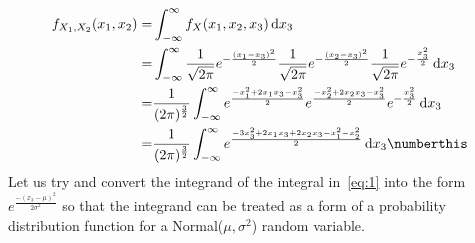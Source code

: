 \documentclass{mthe353answer}
\begin{document}
\begin{questions}
  \setcounter{question}{1}
  \question{}
  \begin{align*}
    f_{X_1,X_2}(x_1,x_2) =& \int_{-\infty}^{\infty} f_X(x_1,x_2,x_3) \,\mathrm{d}x_3\\
    =& \int_{-\infty}^{\infty} \frac{1}{\sqrt{2\pi}} e^{-\frac{(x_1-x_3)^2}{2}} \frac{1}{\sqrt{2\pi}} e^{-\frac{(x_2-x_3)^2}{2}} \frac{1}{\sqrt{2\pi}} e^{-\frac{x_3^2}{2}} \,\mathrm{d}x_3\\
    =& \frac{1}{(2\pi)^\frac{3}{2}} \int_{-\infty}^{\infty} e^{\frac{-x_1^2+2x_1x_3-x_3^2}{2}} e^{\frac{-x_2^2+2x_2x_3-x_3^2}{2}} e^{-\frac{x_3^2}{2}} \,\mathrm{d}x_3\\
    =& \frac{1}{(2\pi)^\frac{3}{2}} \int_{-\infty}^{\infty} e^{\frac{-3x_3^2+2x_1x_3+2x_2x_3-x_1^2-x_2^2}{2}} \,\mathrm{d}x_3 \numberthis \label{eq:1}
  \end{align*}
  Let us try and convert the integrand of the integral in~\eqref{eq:1} into the 
  form \(e^\frac{-(x_3-\mu)^2}{2\sigma^2}\) so that the integrand can be treated 
  as a form of a probability distribution function for a \textapprox{}Normal(\(\mu,\sigma^2\)) 
  random variable.
\end{questions}
\end{document}
